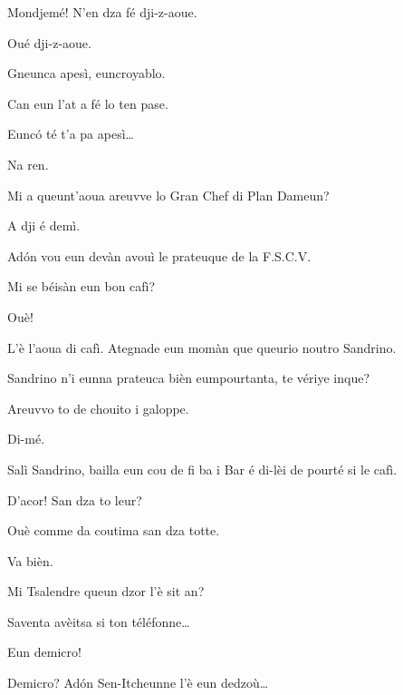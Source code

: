 \begin{drama}
\Richardspeaks Mondjemé! N'en dza fé dji-z-aoue.

\Gerominespeaks Oué dji-z-aoue.

\Richardspeaks Gneunca apesì, euncroyablo.

\Gerominespeaks Can eun l'at a fé lo ten pase.

\Richardspeaks{} Eunc\'o té t'a pa apesì\ldots

\Spritzspeaks Na ren.

\Richardspeaks Mi a queunt’aoua areuvve lo Gran Chef di Plan Dameun?

\Saventaspeaks A dji é demì.

\Richardspeaks Ad\'on vou eun devàn avouì le prateuque de la F.S.C.V.



\Tuenospeaks Mi se béisàn eun bon cafì?

\Tcheuttespeaks Ouè!

\Tuenospeaks L'è l'aoua di cafì. Ategnade eun momàn que queurio noutro Sandrino.



\Tuenospeaks Sandrino n'i eunna prateuca bièn eumpourtanta, te vériye inque?

\Sandrinospeaks Areuvvo to de chouito i galoppe.


\Sandrinospeaks{} Di-mé.

\Tuenospeaks Salì Sandrino, bailla eun cou de fi ba i Bar é di-lèi de pourté si le cafì.

\Sandrinospeaks D'acor! San dza to leur?

\Tuenospeaks Ouè comme da coutima san dza totte.

\Sandrinospeaks Va bièn. 


\Gerominespeaks Mi Tsalendre queun dzor l'è sit an?

\Tuenospeaks Saventa avèitsa si ton téléfonne\ldots

\Saventaspeaks{} Eun demicro!

\Tuenospeaks Demicro? Ad\'on Sen-Itcheunne l'è eun dedzoù\ldots


\end{drama}
